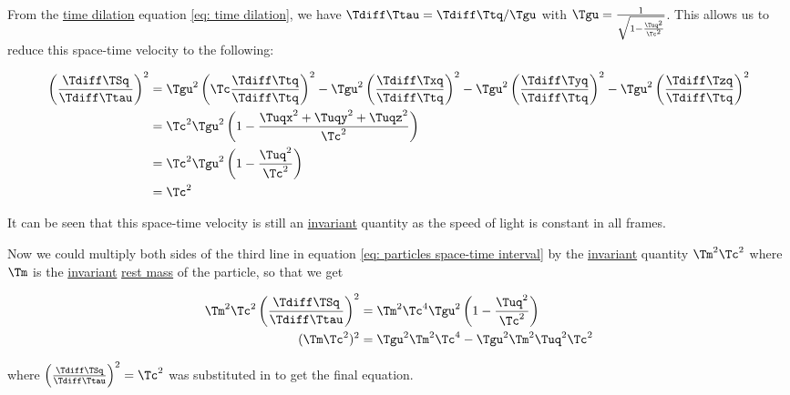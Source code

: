 \begin{derivation}
	From the \hyperlink{def-time-dilation}{time dilation} equation \eqref{eq: time dilation}, we have $\Tdiff \Ttau  = \Tdiff \Ttq  / \Tgu  $ with $\Tgu  = \frac{1}{\sqrt{1-\frac{\Tuq ^2}{ \Tc ^2} } }$.
	This allows us to reduce this space-time velocity to the following:


	\begin{equation}
		\label{eq: particles space-time interval}
		\begin{aligned}
			\left(\frac{\Tdiff \TSq }{\Tdiff \Ttau }\right)^2 & = \Tgu ^2\left(\Tc \frac{ { \Tdiff \Ttq  } }{ { \Tdiff \Ttq  } }\right)^2-\Tgu ^2\left(\frac{\Tdiff \Txq }{ { \Tdiff \Ttq  } }\right)^2-\Tgu ^2\left(\frac{\Tdiff \Tyq }{ { \Tdiff \Ttq  } }\right)^2-\Tgu ^2\left(\frac{\Tdiff \Tzq }{ { \Tdiff \Ttq  } }\right)^2 \\
			                                  & = \Tc ^2\Tgu ^2 \left( 1-\frac{ \Tuqx ^2 + \Tuqy ^2 + \Tuqz ^2}{ \Tc ^2} \right)                                                                                                                        \\
			                                  & = \Tc ^2\Tgu ^2 \left( 1-\frac{\Tuq ^2}{ \Tc ^2} \right)                                                                                                                                                             \\
			                                  & = \Tc ^2
		\end{aligned}
	\end{equation}


	It can be seen that this space-time velocity is still an \hyperlink{def-lorentz-invariant}{invariant} quantity as the speed of light is constant in all frames.

	Now we could multiply both sides of the third line in equation \eqref{eq: particles space-time interval} by the \hyperlink{def-lorentz-invariant}{invariant} quantity $\Tm ^2 \Tc ^2$ where $\Tm $ is the \hyperlink{def-lorentz-invariant}{invariant} \hyperlink{def-rest-mass}{rest mass} of the particle, so that we get

	\begin{equation}
		\begin{aligned}
			\Tm ^2 \Tc ^2 \left(\frac{\Tdiff \TSq }{\Tdiff \Ttau }\right)^2 & = \Tm ^2 \Tc ^4 \Tgu ^2 \left( 1-\frac{\Tuq ^2}{ \Tc ^2} \right) \\
			( \Tm  \Tc ^2)^2                                & = \Tgu ^2 \Tm ^2 \Tc ^4-\Tgu ^2 \Tm ^2 \Tuq ^2 \Tc ^2
		\end{aligned}
	\end{equation}

	where $\left(\frac{\Tdiff \TSq }{\Tdiff \Ttau }\right)^2= \Tc ^2$ was substituted in to get the final equation.

\end{derivation}

